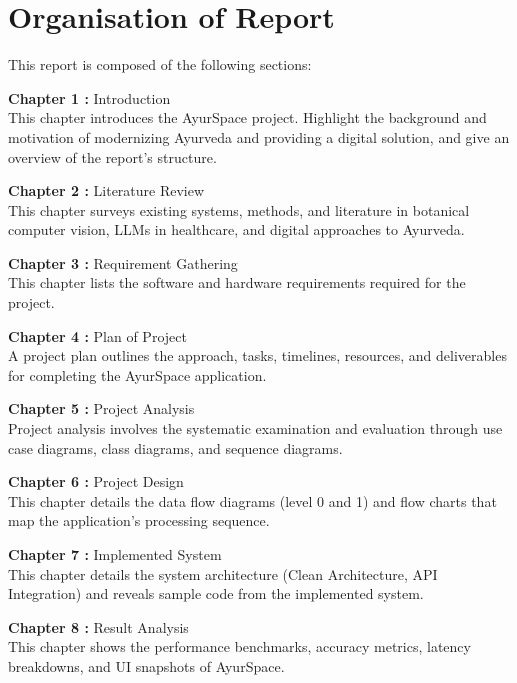 \documentclass[12pt, a4paper]{report}
\begin{document}
\newpage
\section{Organisation of Report}
\justify
This report is composed of the following sections:


\item{\textbf{Chapter 1 :}} Introduction\\
This chapter introduces the AyurSpace project. Highlight the background and motivation of modernizing Ayurveda and providing a digital solution, and give an overview of the report’s structure.

\item{\textbf{Chapter 2 : }} Literature Review\\
This chapter surveys existing systems, methods, and literature in botanical computer vision, LLMs in healthcare, and digital approaches to Ayurveda.

\item{\textbf{Chapter 3 : }} Requirement Gathering\\
This chapter lists the software and hardware requirements required for the project.

\item {\textbf{Chapter 4 : }} Plan of Project\\
A project plan outlines the approach, tasks, timelines, resources, and deliverables for completing the AyurSpace application.

\item {\textbf{Chapter 5 : }} Project Analysis\\
Project analysis involves the systematic examination and evaluation through use case diagrams, class diagrams, and sequence diagrams.

 \item {\textbf{Chapter 6 : }} Project Design\\
This chapter details the data flow diagrams (level 0 and 1) and flow charts that map the application's processing sequence.

\item {\textbf{Chapter 7 : }} Implemented System\\
This chapter details the system architecture (Clean Architecture, API Integration) and reveals sample code from the implemented system.

\item {\textbf{Chapter 8 : }} Result Analysis\\
This chapter shows the performance benchmarks, accuracy metrics, latency breakdowns, and UI snapshots of AyurSpace.
\end{document}
